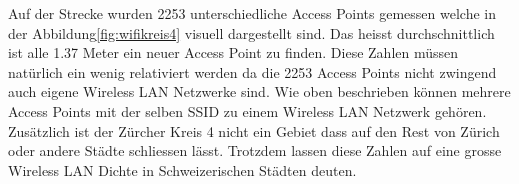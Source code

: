 Auf der Strecke wurden 2253 unterschiedliche Access Points gemessen welche in der Abbildung\ref{fig:wifikreis4} visuell dargestellt sind. Das heisst durchschnittlich ist alle 1.37 Meter ein neuer Access Point zu finden. Diese Zahlen müssen natürlich ein wenig relativiert werden da die 2253 Access Points nicht zwingend auch eigene Wireless LAN Netzwerke sind. Wie oben beschrieben können mehrere Access Points mit der selben SSID zu einem Wireless LAN Netzwerk gehören. Zusätzlich ist der Zürcher Kreis 4 nicht ein Gebiet dass auf den Rest von Zürich oder andere Städte schliessen lässt. Trotzdem lassen diese Zahlen auf eine grosse Wireless LAN Dichte in Schweizerischen Städten deuten.


